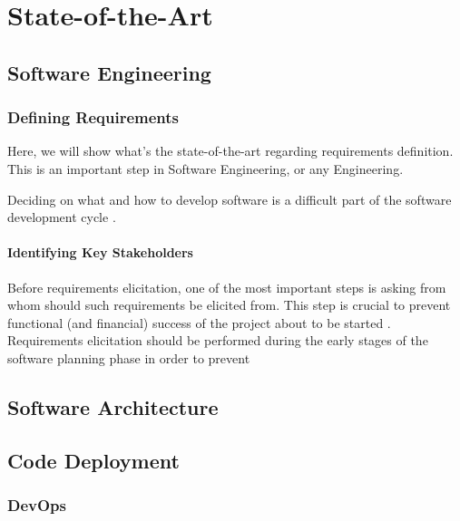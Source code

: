 \chapter{State-of-the-Art}\label{state-of-the-art}

\section{Software Engineering}\label{state-of-the-art:s:software-engineering}

\subsection{Defining Requirements}\label{state-of-the-art:ss:defining-requirements}

Here, we will show what's the state-of-the-art regarding requirements definition. This is an important step in Software Engineering, or any Engineering.

Deciding on what and how to develop software is a difficult part of the software development cycle \parencite{pacheco_garcía_reyes_2018}.

\subsubsection{Identifying Key Stakeholders}\label{state-of-the-art:sss:identifying-key-stakeholders}

Before requirements elicitation, one of the most important steps is asking from whom should such requirements be elicited from. This step is crucial to prevent functional (and financial) success of the project about to be started \parencite{lewellen_2020}. Requirements elicitation should be performed during the early stages of the software planning phase in order to prevent



\section{Software Architecture}\label{state-of-the-art:s:software-architecture}

\section{Code Deployment}\label{state-of-the-art:s:code-deployment}

\subsection{DevOps}\label{state-of-the-art:ss:devops}

